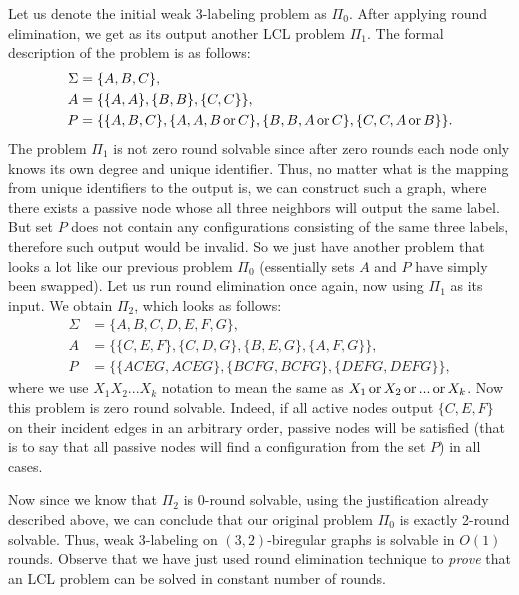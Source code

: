 Let us denote the initial weak 3-labeling problem as $\Pi_0$. After applying round elimination, we get as its
output another LCL problem $\Pi_1$. The formal description of the problem is as follows:
\begin{align*}
\Sigma &= \{A, B, C\}, \\
A &= \{ \{A, A\}, \{B, B\}, \{C, C\}\}, \\
P &= \{ \{A, B ,C\}, \{A, A, B \operatorname{or} C\}, \{B, B, A \operatorname{or} C\}, \{C, C, A \operatorname{or} B\} \}.
\end{align*}
The problem $\Pi_1$ is not zero round solvable since after zero rounds each node only
knows its own degree and unique identifier. Thus, no matter what is the mapping from
unique identifiers to the output is, we can construct such a graph, where there exists
a passive node whose all three neighbors will output the same label. But set $P$ does not
contain any configurations consisting of the same three labels, therefore such
output would be invalid. So we just have another problem that looks a lot like our
previous problem $\Pi_0$ (essentially sets $A$ and $P$ have simply been swapped).
Let us run round elimination once again, now using $\Pi_1$ as its input. We obtain
$\Pi_2$, which looks as follows:
\begin{align*}
\Sigma &= \{A, B, C, D, E, F, G\}, \\
A &= \{ \{C, E, F\}, \{C, D, G\}, \{B, E, G\}, \{A, F, G\}\}, \\
P &= \{ \{ACEG, ACEG\}, \{BCFG, BCFG\}, \{DEFG, DEFG\} \},
\end{align*}
where we use $X_1X_2...X_k$ notation to mean the same as $X_1 \operatorname{or} X_2 \operatorname{or} ... \operatorname{or} X_k$.
Now this problem is zero round solvable. Indeed, if all active nodes output $\{C, E, F\}$
on their incident edges in an arbitrary order, passive nodes will be satisfied (that is to say
that all passive nodes will find a configuration from the set $P$) in all cases.

Now since we know that $\Pi_2$ is 0-round solvable, using the justification already described
above, we can conclude that our original problem $\Pi_0$ is exactly 2-round solvable. Thus,
weak 3-labeling on $(3, 2)$-biregular graphs is solvable in $O(1)$ rounds. Observe that
we have just used round elimination technique to \emph{prove} that an LCL problem can be
solved in constant number of rounds.

